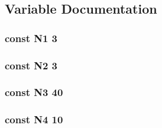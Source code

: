 \subsection{Variable Documentation}
\hypertarget{qrmask_8php_ac1493f26237d5c1f94983ebc237b156f}{
\subsubsection[{N1}]{\setlength{\rightskip}{0pt plus 5cm}const N1 3}}\label{qrmask_8php_ac1493f26237d5c1f94983ebc237b156f}
\hypertarget{qrmask_8php_aefd0c1acafb0b6c3d11e9a73023c5c4b}{
\subsubsection[{N2}]{\setlength{\rightskip}{0pt plus 5cm}const N2 3}}\label{qrmask_8php_aefd0c1acafb0b6c3d11e9a73023c5c4b}
\hypertarget{qrmask_8php_ac5f0aec2f97594f526ee06937485c95d}{
\subsubsection[{N3}]{\setlength{\rightskip}{0pt plus 5cm}const N3 40}}\label{qrmask_8php_ac5f0aec2f97594f526ee06937485c95d}
\hypertarget{qrmask_8php_a3ce7add5edc7537a8270fe02c20c165d}{
\subsubsection[{N4}]{\setlength{\rightskip}{0pt plus 5cm}const N4 10}}\label{qrmask_8php_a3ce7add5edc7537a8270fe02c20c165d}
